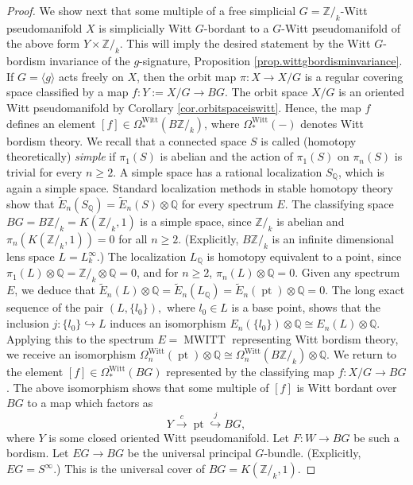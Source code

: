 \documentclass[10pt,a4paper]{amsart}
\newcommand {\MWITT}   {\ensuremath{\operatorname{MWITT}}}
\newcommand {\Witt}   {{\ensuremath{\operatorname{Witt}}}}
\newcommand {\intg}  {\ensuremath{\mathbb{Z}}}
\newcommand {\pt}    {\ensuremath{\operatorname{pt}}}
\newcommand {\rat}   {\ensuremath{\mathbb{Q}}}
\begin{document}
\begin{proof}
We show next that some multiple of a free simplicial $G=\intg/_k$-Witt pseudomanifold $X$
is simplicially Witt $G$-bordant to a $G$-Witt pseudomanifold of the above form 
$Y \times \intg/_k$. This will imply the desired statement by the
Witt $G$-bordism invariance of the $g$-signature,
Proposition \ref{prop.wittgbordisminvariance}.
If $G=\langle g \rangle$ acts freely on $X$, then the orbit map
$\pi: X \to X/G$ is a regular covering space classified by a map
$f: Y := X/G \to BG$. The orbit space $X/G$ is an oriented Witt pseudomanifold by
Corollary \ref{cor.orbitspaceiswitt}.
Hence, the map $f$ defines an element
$[f] \in \Omega^\Witt_* (B\intg/_k)$, where $\Omega^\Witt_* (-)$ denotes
Witt bordism theory.
We recall that a connected space $S$ is called (homotopy theoretically) 
\emph{simple} if $\pi_1 (S)$ is abelian and the action of
$\pi_1 (S)$ on $\pi_n (S)$ is trivial for every $n\geq 2$.
A simple space has a rational localization $S_\rat$, which is again a simple space.
Standard localization methods in stable homotopy theory show that
$\widetilde{E}_n (S_\rat) = \widetilde{E}_n (S) \otimes \rat$
for every spectrum $E$.
The classifying space $BG=B\intg/_k = K(\intg/_k, 1)$ is a simple
space, since $\intg/_k$ is abelian and $\pi_n (K(\intg/_k, 1))=0$ for all
$n\geq 2$. (Explicitly, $B\intg/_k$ is an infinite dimensional lens space
$L = L^\infty_k$.)
The localization $L_\rat$ is homotopy equivalent to a point, since
$\pi_1 (L) \otimes \rat = \intg/_k \otimes \rat =0$,
and for $n\geq 2$, $\pi_n (L) \otimes \rat =0$.
Given any spectrum $E$, we deduce that
$\widetilde{E}_n (L) \otimes \rat = \widetilde{E}_n (L_\rat) 
= \widetilde{E}_n (\pt) \otimes \rat =0.$
The long exact sequence of the pair $(L, \{ l_0 \}),$ where $l_0 \in L$ is a base point,
shows that the inclusion $j:\{ l_0 \} \hookrightarrow L$
induces an isomorphism
$E_n (\{ l_0 \}) \otimes \rat \cong
   E_n (L) \otimes \rat.$
Applying this to the spectrum $E=\MWITT$ representing Witt bordism theory,
we receive an isomorphism
$\Omega^\Witt_n (\pt) \otimes \rat \cong
   \Omega^\Witt_n (B\intg/_k) \otimes \rat.$
We return to the element
$[f] \in \Omega^\Witt_* (BG)$ represented by the classifying map $f:X/G \to BG$.
The above isomorphism shows that some multiple of $[f]$ is
Witt bordant over $BG$ to a map which factors as
\[ Y \stackrel{c}{\longrightarrow} 
    \pt \stackrel{j}{\hookrightarrow}
     BG, \]
where $Y$ is some closed oriented Witt pseudomanifold.     
Let $F:W \to BG$ be such a bordism.     
Let $EG \to BG$ be the universal principal $G$-bundle.
(Explicitly, $EG = S^\infty$.) This is the universal cover of $BG=K(\intg/_k, 1)$.

\end{proof}
\end{document}

